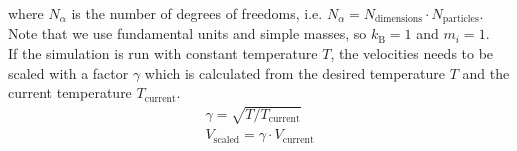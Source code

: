 \documentclass{article}
\begin{document}
where $N_\alpha$ is the number of degrees of freedoms, i.e. $N_\alpha = N_{\mathrm{dimensions}} \cdot N_{\mathrm{particles}}$. Note that we use fundamental units and simple masses, so $k_\mathrm{B} = 1$ and $m_i = 1$.\\

If the simulation is run with constant temperature $T$, the velocities needs to be scaled with a factor $\gamma$ which is calculated from the desired temperature $T$ and the current temperature $T_\mathrm{current}$.
\begin{eqnarray}
    \gamma = \sqrt{T/T_\mathrm{current}}\\
    \label{eq:temp_factor}
    V_\mathrm{scaled} = \gamma \cdot V_\mathrm{current}
\end{eqnarray}

% 


%
%
%
%
%
%
\end{document}
